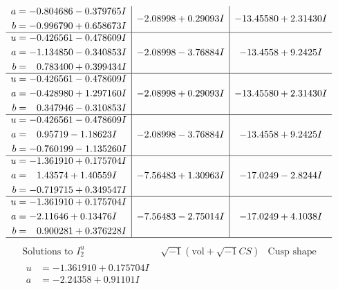 \documentclass[1p]{elsarticle_modified}
\theoremstyle{definition}
\newcommand{\I}{\sqrt{-1}}
\begin{document}
$$\begin{array}{c|c|c}
\begin{aligned}
a &= -0.804686 - 0.379765 I \\
b &= -0.996790 + 0.658673 I\end{aligned}
 & -2.08998 + 0.29093 I & -13.45580 + 2.31430 I \\ \hline\begin{aligned}
u &= -0.426561 - 0.478609 I \\
a &= -1.134850 - 0.340853 I \\
b &= \phantom{-}0.783400 + 0.399434 I\end{aligned}
 & -2.08998 - 3.76884 I & -13.4558 + 9.2425 I \\ \hline\begin{aligned}
u &= -0.426561 - 0.478609 I \\
a &= -0.428980 + 1.297160 I \\
b &= \phantom{-}0.347946 - 0.310853 I\end{aligned}
 & -2.08998 + 0.29093 I & -13.45580 + 2.31430 I \\ \hline\begin{aligned}
u &= -0.426561 - 0.478609 I \\
a &= \phantom{-}0.95719 - 1.18623 I \\
b &= -0.760199 - 1.135260 I\end{aligned}
 & -2.08998 - 3.76884 I & -13.4558 + 9.2425 I \\ \hline\begin{aligned}
u &= -1.361910 + 0.175704 I \\
a &= \phantom{-}1.43574 + 1.40559 I \\
b &= -0.719715 + 0.349547 I\end{aligned}
 & -7.56483 + 1.30963 I & -17.0249 - 2.8244 I \\ \hline\begin{aligned}
u &= -1.361910 + 0.175704 I \\
a &= -2.11646 + 0.13476 I \\
b &= \phantom{-}0.900281 + 0.376228 I\end{aligned}
 & -7.56483 - 2.75014 I & -17.0249 + 4.1038 I\\
 \hline 
 \end{array}$$\newpage$$\begin{array}{c|c|c}  
\text{Solutions to }I^u_{2}& \I (\text{vol} + \sqrt{-1}CS) & \text{Cusp shape}\\
 \hline 
\begin{aligned}
u &= -1.361910 + 0.175704 I \\
a &= -2.24358 + 0.91101 I \\

\end{aligned}
\end{array}$$
\end{document}
